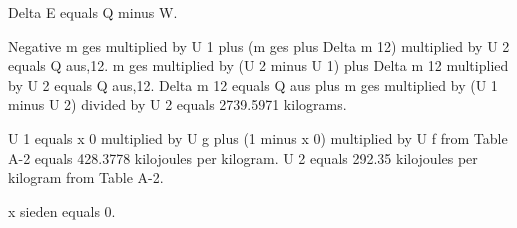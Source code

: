Delta E equals Q minus W.  

Negative m ges multiplied by U 1 plus (m ges plus Delta m 12) multiplied by U 2 equals Q aus,12.  
m ges multiplied by (U 2 minus U 1) plus Delta m 12 multiplied by U 2 equals Q aus,12.  
Delta m 12 equals Q aus plus m ges multiplied by (U 1 minus U 2) divided by U 2 equals 2739.5971 kilograms.  

U 1 equals x 0 multiplied by U g plus (1 minus x 0) multiplied by U f from Table A-2 equals 428.3778 kilojoules per kilogram.  
U 2 equals 292.35 kilojoules per kilogram from Table A-2.  

x sieden equals 0.